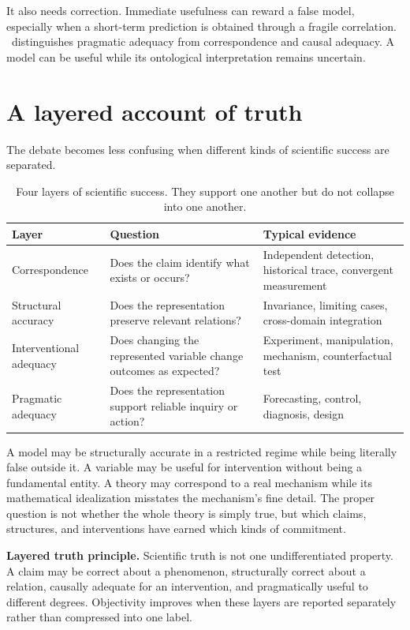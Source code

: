 It also needs correction. Immediate usefulness can reward a false model,
especially when a short-term prediction is obtained through a fragile
correlation. \RCR\ distinguishes pragmatic adequacy from correspondence and
causal adequacy. A model can be useful while its ontological interpretation
remains uncertain.

\section{A layered account of truth}

The debate becomes less confusing when different kinds of scientific success
are separated.

\begin{table}[ht]
\centering
\smalltable
\begin{tabularx}{\textwidth}{p{}Y Y}
\toprule
Layer & Question & Typical evidence\\
\midrule
Correspondence & Does the claim identify what exists or occurs? & Independent detection, historical trace, convergent measurement\\
Structural accuracy & Does the representation preserve relevant relations? & Invariance, limiting cases, cross-domain integration\\
Interventional adequacy & Does changing the represented variable change outcomes as expected? & Experiment, manipulation, mechanism, counterfactual test\\
Pragmatic adequacy & Does the representation support reliable inquiry or action? & Forecasting, control, diagnosis, design\\
\bottomrule
\end{tabularx}
\caption{Four layers of scientific success. They support one another but do not
collapse into one another.}
\label{tab:truth-layers}
\end{table}

A model may be structurally accurate in a restricted regime while being
literally false outside it. A variable may be useful for intervention without
being a fundamental entity. A theory may correspond to a real mechanism while
its mathematical idealization misstates the mechanism's fine detail. The
proper question is not whether the whole theory is simply true, but which
claims, structures, and interventions have earned which kinds of commitment.

\begin{principlebox}
\textbf{Layered truth principle.} Scientific truth is not one undifferentiated
property. A claim may be correct about a phenomenon, structurally correct
about a relation, causally adequate for an intervention, and pragmatically
useful to different degrees. Objectivity improves when these layers are
reported separately rather than compressed into one label.
\end{principlebox}

